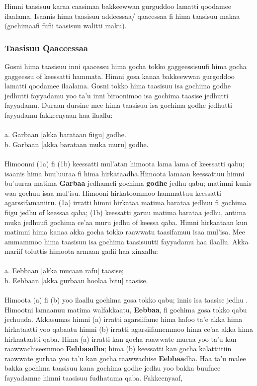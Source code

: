 \documentclass[11pt,b5paper]{book}
\begin{document}
Himni taasisuu karaa caasimaa bakkeewwan gurguddoo lamatti qoodamee ilaalama. Isaanis hima taasisuu addeessaa/ qaacessaa fi hima taasisuu makaa (gochimaafi fufii taasisuu walitti maku). 

\subsubsection{Taasisuu Qaaccessaa }

Gosni hima taasisuu inni qaacessu hima gocha tokko gaggeessisuufi hima gocha gaggeessu of keessatti hammata. Himni gosa kanaa bakkeewwan gurgoddoo lamatti qoodamee ilaalama. Gosni tokko hima taasisuu isa gochima godhe jedhutti fayyadamu yoo ta’u inni biroonimoo isa gochima taasise jedhutti fayyadamu. Duraan dursine mee hima taasisuu isa gochima godhe jedhutti fayyadamu fakkeenyaan haa ilaallu: \\
\\
a. Garbaan [akka barataan fiigu] godhe.\\
b. Garbaan [akka barataan muka muru] godhe. \\
\\
Himoonni (1a) fi (1b) keessatti mul’atan himoota lama lama of keessatti qabu; isaanis hima buu’uuraa fi hima hirkataadha.Himoota lamaan keessattuu himni bu’uuraa matima \textbf{Garbaa} jedhamefi gochima \textbf{godhe} jedhu qabu; matimni kunis waa gochuu isaa mul’isu. Himooni hirkatoommoo hammattuu
keessatti agarssifamaniiru. (1a) irratti himni hirkataa matima barataa jedhuu fi gochima fiigu jedhu of keessaa qaba; (1b) keessatti garuu matima barataa jedhu, antima muka jedhuufi gochima ce’aa muru jedhu of keessa qaba. Himni hirkaataan kun matimni hima kanaa akka gocha tokko raawwatu taasifamuu isaa mul’isa. Mee ammammoo hima taasisuu isa gochima taasisuutti fayyadamu haa ilaallu. Akka mariif toluttis himoota armaan gadii haa xinxallu: \\
\\
a. Eebbaan [akka mucaan rafu] taasise; \\
b. Eebbaan [akka gurbaan hoolaa bitu] taasise.\\
\\
Himoota (a) fi (b) yoo ilaallu gochima gosa tokko qabu; innis isa taasise jedhu . Himootni lamaanuu matima walfakkaatu, \textbf{Eebbaa}, fi gochima gosa tokko qabu jechuuda. Akkasumas himni (a) irratti agarsiifame hima hafoo ta’e akka hima hirkataatti yoo qabaatu himni (b) irratti agarsiifamemmoo
hima ce’aa akka hima hirkaataatti qaba. Hima (a) irratti kan gocha raawwate mucaa yoo ta’u kan raawwachiseemmoo \textbf{Eebbaadha}; hima (b) keessatti kan gocha kalattiitiin raawwate gurbaa yoo ta’u kan gocha raawwachise \textbf{Eebbaa}dha. Haa ta’u malee bakka gochima taasisuu kana gochima godhe jedhu yoo bakka buufnee fayyadamne himni taasisuu fudhatama qaba. Fakkeenyaaf, \\
\end{document}
